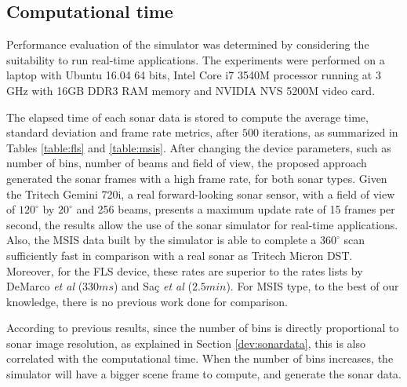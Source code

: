 \documentclass[final,5p,times]{elsarticle}
\begin{document}
\subsection{Computational time}

Performance evaluation of the simulator was determined by considering the
suitability to run real-time applications. The experiments were performed
on a laptop with Ubuntu 16.04 64 bits, Intel Core i7 3540M processor
running at 3 GHz with 16GB DDR3 RAM memory and NVIDIA NVS 5200M video card.

The elapsed time of each sonar data is stored to compute the average time,
standard deviation and frame rate metrics, after $500$ iterations, as
summarized in Tables \ref{table:fls} and \ref{table:msis}. After changing
the device parameters, such as number of bins, number of beams and field
of view, the proposed approach generated the sonar frames with a high
frame rate, for both sonar types. Given the Tritech Gemini 720i, a real
forward-looking sonar sensor, with a field of view of $120^{\circ}$ by
$20^{\circ}$ and 256 beams, presents a maximum update rate of 15 frames
per second, the results allow the use of the sonar simulator for real-time
applications. Also, the MSIS data built by the simulator is able to
complete a $360^{\circ}$ scan sufficiently fast in comparison with a
real sonar as Tritech Micron DST. Moreover, for the FLS device, these
rates are superior to the rates lists by DeMarco \textit{et al}
\cite{demarco2015} ($330 ms$) and Saç \textit{et al} \cite{sac2015}
($2.5 min$). For MSIS type, to the best of our knowledge, there is no
previous work done for comparison.

According to previous results, since the number of bins is directly
proportional to sonar image resolution, as explained in Section
\ref{dev:sonardata}, this is also correlated with the computational time.
When the number of bins increases, the simulator will have a bigger scene
frame to compute, and generate the sonar data.
\end{document}
